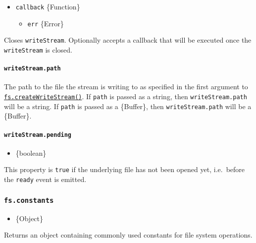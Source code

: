 \begin{itemize}
\tightlist
\item
  \texttt{callback} \{Function\}

  \begin{itemize}
  \tightlist
  \item
    \texttt{err} \{Error\}
  \end{itemize}
\end{itemize}

Closes \texttt{writeStream}. Optionally accepts a callback that will be
executed once the \texttt{writeStream} is closed.

\paragraph{\texorpdfstring{\texttt{writeStream.path}}{writeStream.path}}\label{writestream.path}

The path to the file the stream is writing to as specified in the first
argument to
\hyperref[fscreatewritestreampath-options]{\texttt{fs.createWriteStream()}}.
If \texttt{path} is passed as a string, then \texttt{writeStream.path}
will be a string. If \texttt{path} is passed as a \{Buffer\}, then
\texttt{writeStream.path} will be a \{Buffer\}.

\paragraph{\texorpdfstring{\texttt{writeStream.pending}}{writeStream.pending}}\label{writestream.pending}

\begin{itemize}
\tightlist
\item
  \{boolean\}
\end{itemize}

This property is \texttt{true} if the underlying file has not been
opened yet, i.e.~before the
\texttt{\textquotesingle{}ready\textquotesingle{}} event is emitted.

\subsubsection{\texorpdfstring{\texttt{fs.constants}}{fs.constants}}\label{fs.constants}

\begin{itemize}
\tightlist
\item
  \{Object\}
\end{itemize}

Returns an object containing commonly used constants for file system
operations.

